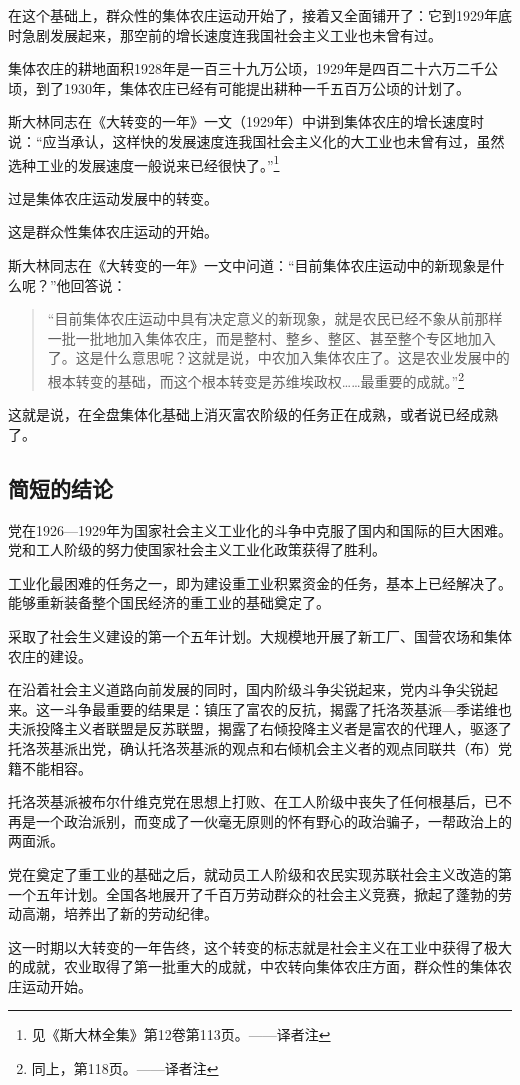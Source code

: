在这个基础上，群众性的集体农庄运动开始了，接着又全面铺开了：它到1929年底时急剧发展起来，那空前的增长速度连我国社会主义工业也未曾有过。

集体农庄的耕地面积1928年是一百三十九万公顷，1929年是四百二十六万二千公顷，到了1930年，集体农庄已经有可能提出耕种一千五百万公顷的计划了。

斯大林同志在《大转变的一年》一文（1929年）中讲到集体农庄的增长速度时说：“应当承认，这样快的发展速度连我国社会主义化的大工业也未曾有过，虽然选种工业的发展速度一般说来已经很快了。”\footnote{见《斯大林全集》第12卷第113页。——译者注}

过是集体农庄运动发展中的转变。

这是群众性集体农庄运动的开始。

斯大林同志在《大转变的一年》一文中问道：“目前集体农庄运动中的新现象是什么呢？”他回答说：

\begin{quotation}
“目前集体农庄运动中具有决定意义的新现象，就是农民已经不象从前那样一批一批地加入集体农庄，而是整村、整乡、整区、甚至整个专区地加入了。这是什么意思呢？这就是说，中农加入集体农庄了。这是农业发展中的根本转变的基础，而这个根本转变是苏维埃政权……最重要的成就。”\footnote{同上，第118页。——译者注}
\end{quotation}

这就是说，在全盘集体化基础上消灭富农阶级的任务正在成熟，或者说已经成熟了。


\subsection{简短的结论}

党在1926—1929年为国家社会主义工业化的斗争中克服了国内和国际的巨大困难。党和工人阶级的努力使国家社会主义工业化政策获得了胜利。

工业化最困难的任务之一，即为建设重工业积累资金的任务，基本上已经解决了。能够重新装备整个国民经济的重工业的基础奠定了。

采取了社会生义建设的第一个五年计划。大规模地开展了新工厂、国营农场和集体农庄的建设。

在沿着社会主义道路向前发展的同时，国内阶级斗争尖锐起来，党内斗争尖锐起来。这一斗争最重要的结果是：镇压了富农的反抗，揭露了托洛茨基派—季诺维也夫派投降主义者联盟是反苏联盟，揭露了右倾投降主义者是富农的代理人，驱逐了托洛茨基派出党，确认托洛茨基派的观点和右倾机会主义者的观点同联共（布）党籍不能相容。

托洛茨基派被布尔什维克党在思想上打败、在工人阶级中丧失了任何根基后，已不再是一个政治派别，而变成了一伙毫无原则的怀有野心的政治骗子，一帮政治上的两面派。

党在奠定了重工业的基础之后，就动员工人阶级和农民实现苏联社会主义改造的第一个五年计划。全国各地展开了千百万劳动群众的社会主义竞赛，掀起了蓬勃的劳动高潮，培养出了新的劳动纪律。

这一时期以大转变的一年告终，这个转变的标志就是社会主义在工业中获得了极大的成就，农业取得了第一批重大的成就，中农转向集体农庄方面，群众性的集体农庄运动开始。


